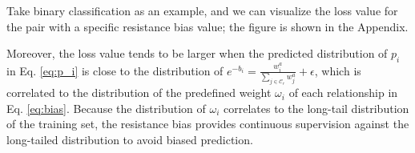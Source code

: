 Take binary classification as an example, and we can visualize the loss value for the pair with a specific resistance bias value; the figure is shown in the Appendix.



Moreover, the loss value tends to be larger when the predicted distribution of $p_i$ in Eq. \eqref{eq:p_i} is close to the distribution of $e^{-b_i}= \frac{w_i^{a}}{\sum_{j \in \mathcal{C}_r} w_j^a}+ \epsilon$, which is correlated to the distribution of the predefined weight $\omega_i$ of each relationship in Eq. \eqref{eq:bias}. Because the distribution of $\omega_i$ correlates to the long-tail distribution of the training set, the resistance bias provides continuous supervision against the long-tailed distribution to avoid biased prediction.






